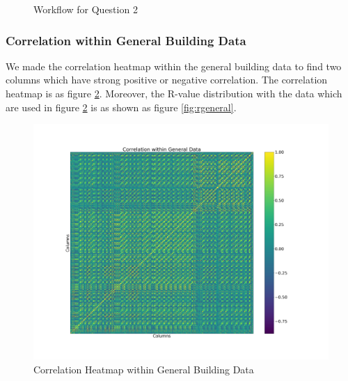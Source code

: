 \documentclass[aps, 10pt, a4paper]{article}
\begin{document}
\begin{figure}[htbp]
                    \caption{Workflow for Question 2}
                    \label{fig:workflow2}
                \end{figure}
 
            \subsubsection{Correlation within General Building Data} 
                We made the correlation heatmap within the general building data to find two columns which have strong positive or negative correlation. The correlation heatmap is as figure \ref{fig:correlationgeneral}. Moreover, the R-value distribution with the data which are used in figure \ref{fig:correlationgeneral} is as shown as figure \ref{fig:rgeneral}.
                
                \begin{figure}[htbp]
                    \centering
                    \includegraphics[width=0.4 \linewidth]{figures/correlationgeneral.png}
                    \caption{Correlation Heatmap within General Building Data}
                    \label{fig:correlationgeneral}
                \end{figure}
            
\end{document}
